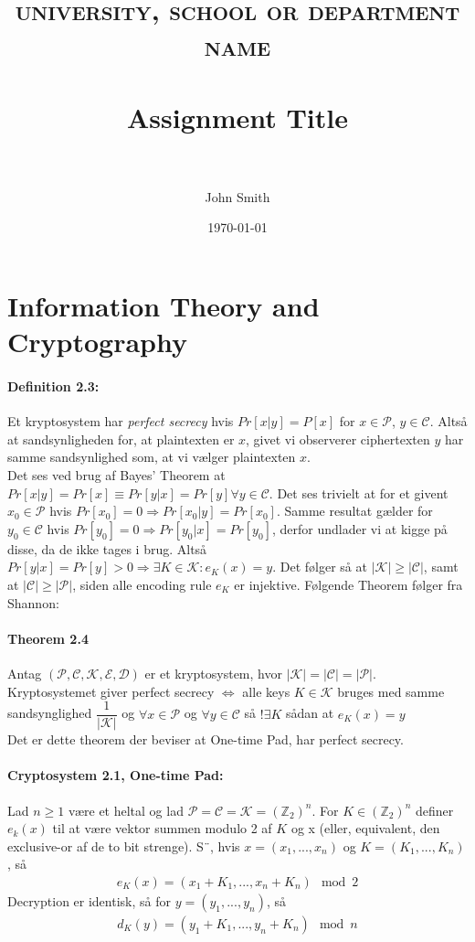 \documentclass[paper=a4, fontsize=11pt]{scrartcl} %
\title{	
	\normalfont \normalsize 
	\textsc{university, school or department name} \\ [25pt] %
	\horrule{0.5pt} \\[0.4cm] %
	\huge Assignment Title \\ %
	\horrule{2pt} \\[0.5cm] %
}
\author{John Smith} %
\date{\normalsize\today} %
\numberwithin{equation}{section} %
\numberwithin{figure}{section} %
\numberwithin{table}{section} %
\begin{document}
	
	\section{Information Theory and Cryptography}
	
	\paragraph{\textbf{Definition 2.3:}} Et kryptosystem har \textit{perfect secrecy} hvis $Pr[x|y]=P[x]$ for $x\in\mathcal{P}$, $y\in\mathcal{C}$. Altså at sandsynligheden for, at plaintexten er $x$, givet vi observerer ciphertexten $y$ har samme sandsynlighed som, at vi vælger plaintexten $x$.  \\
	
	Det ses ved brug af Bayes' Theorem at $Pr[x|y]=Pr[x] \equiv Pr[y|x]=Pr[y] \forall y\in\mathcal{C}$. Det ses trivielt at for et givent $x_0\in\mathcal{P}$ hvis $Pr[x_0]=0 \Rightarrow Pr[x_0|y]=Pr[x_0]$. Samme resultat gælder for $y_0\in\mathcal{C}$ hvis $Pr[y_0]=0 \Rightarrow Pr[y_0|x]=Pr[y_0]$, derfor undlader vi at kigge på disse, da de ikke tages i brug. Altså $Pr[y|x]=Pr[y]>0 \Rightarrow \exists K\in\mathcal{K}:e_K(x)=y$. Det følger så at $|\mathcal{K}|\geq|\mathcal{C}|$, samt at $|\mathcal{C}|\geq|\mathcal{P}|$, siden alle encoding rule $e_K$ er injektive. Følgende Theorem følger fra Shannon:
	
	\paragraph{\textbf{Theorem 2.4}} Antag $(\mathcal{P}, \mathcal{C}, \mathcal{K}, \mathcal{E}, \mathcal{D})$ er et kryptosystem, hvor $|\mathcal{K}|=|\mathcal{C}|=|\mathcal{P}|$. Kryptosystemet giver perfect secrecy $\iff$ alle keys $K\in\mathcal{K}$ bruges med samme sandsynglighed $\dfrac{1}{|\mathcal{K}|}$ og $\forall x\in\mathcal{P}$ og $\forall y\in\mathcal{C}$ så $!\exists K$ sådan at $e_K(x)=y$ \\
	
	Det er dette theorem der beviser at One-time Pad, har perfect secrecy. 
	
	\begin{mdframed}
	\paragraph{\textbf{Cryptosystem 2.1, One-time Pad:}} Lad $n\geq 1$ være et heltal og lad $\mathcal{P}=\mathcal{C}=\mathcal{K}=(\mathbb{Z}_2)^n$. For $K\in(\mathbb{Z}_2)^n$ definer $e_k(x)$ til at være vektor summen modulo 2 af $K$ og x (eller, equivalent, den exclusive-or af de to bit strenge). S¨, hvis $x=(x_1,...,x_n)$ og $K=(K_1,...,K_n)$, så 
	\begin{align*}
	e_K(x)=(x_1+K_1,...,x_n+K_n)\mod{2}
	\end{align*}
	Decryption er identisk, så for $y=(y_1,...,y_n)$, så
	\begin{align*}
	d_K(y)=(y_1+K_1,...,y_n+K_n)\mod{n}
	\end{align*}
	\end{mdframed}
	
\end{document}
